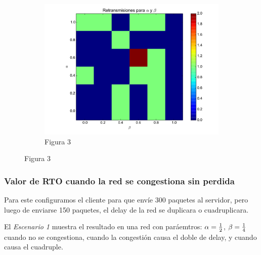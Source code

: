 \begin{figure}[H]
\begin{subfigure}{0.32\textwidth}
		    \includegraphics[width=1.0\textwidth]{imagenes/guille/retransmisiones_300.pdf}
		    \caption{Figura 3}
	    \end{subfigure}
	
    \end{figure}    


    \subsubsection{Valor de RTO cuando la red se congestiona sin perdida}
        Para este configuramos el cliente para que env\'ie 300 paquetes al
        servidor, pero luego de enviarse 150 paquetes, el delay de la red
        se duplicara o cuadruplicara. 
        
        El \emph{Escenario 1} muestra el resultado en una red con
        par\'aemtros: $\alpha={{1}\over{2}}$, $\beta={{1}\over{4}}$
        cuando no se congestiona, cuando la congesti\'on causa el doble de
        delay, y cuando causa el cuadruple.
  
